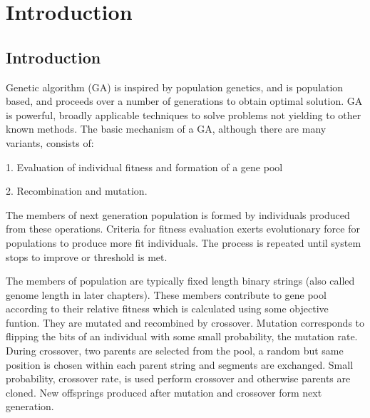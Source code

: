 \chapter{Introduction} \label{ch:introduction}

\section{Introduction}
Genetic algorithm (GA) is inspired by population genetics, and is population based, and proceeds over a number of generations to obtain optimal solution. GA is powerful, broadly applicable techniques to solve problems not yielding to other known methods. The basic mechanism of a GA, although there are many variants, consists of:

1. Evaluation of individual fitness and formation of a gene pool

2. Recombination and mutation.

The members of next generation population is formed by individuals produced from these operations. Criteria for fitness evaluation exerts evolutionary force for populations to produce more fit individuals. The process is repeated until system stops to improve or threshold is met.

The members of population are typically fixed length binary strings (also called genome length in later chapters). These members contribute to gene pool according to their relative fitness which is calculated using some objective funtion. They are mutated and recombined by crossover. Mutation corresponds to flipping the bits of an individual with some small probability, the mutation rate. During crossover, two parents are selected from the pool, a random but same position is chosen within each parent string and segments are exchanged. Small probability, crossover rate, is used perform crossover and otherwise parents are cloned. New offsprings produced after mutation and crossover form next generation.

